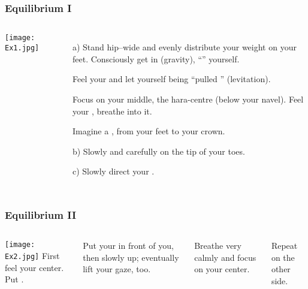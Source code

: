 \begin{frame}
\frametitle{Equilibrium I}


\begin{columns}[c] %
\texttt{[image: Ex1.jpg]}
\begin{itemize}
\item[a)] Stand hip--wide and evenly distribute your weight on your feet. Consciously get in  (gravity), ``'' yourself.

Feel your  and let yourself being ``pulled '' (levitation).

Focus on your middle, the hara-centre (below your navel). Feel your , breathe into it.

Imagine a , from your feet to your crown. \pause
\item[b)] Slowly and carefully  on the tip of your toes. \pause
\item[c)] Slowly direct your .
\end{itemize}
\end{columns}
\end{frame}
\begin{frame}
\frametitle{Equilibrium II}


\begin{columns}[c] %
\texttt{[image: Ex2.jpg]}
First feel your center. Put . 

Put your  in front of you, then  slowly up; eventually lift your gaze, too.

Breathe very calmly and focus on your center.

Repeat on the other side.
\end{columns}
\end{frame}
